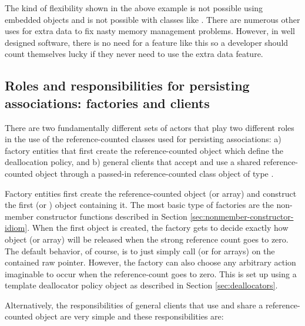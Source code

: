 \documentclass[pdf,ps2pdf,11pt]{SANDreport}
\begin{document}
The kind of flexibility shown in the above example is not possible
using embedded objects and is not possible with classes like
{}.  There are numerous other uses for extra
data to fix nasty memory management problems.  However, in well
designed software, there is no need for a feature like this so a
developer should count themselves lucky if they never need to use the
extra data feature.


%
{}\subsection{Roles and responsibilities for persisting associations:
factories and clients}
%

There are two fundamentally different sets of actors that play two
different roles in the use of the reference-counted classes used for
persisting associations: a) factory entities that first create the
reference-counted object {} which define the deallocation
policy, and b) general clients that accept and use a shared
reference-counted object {} through a passed-in
reference-counted class object of type {}.

Factory entities first create the reference-counted object (or array)
and construct the first {} (or {}) object
containing it.  The most basic type of factories are the non-member
constructor functions described in Section
{}\ref{sec:nonmember-constructor-idiom}.  When the first {}
object is created, the factory gets to decide exactly how object (or
array) will be released when the strong reference count goes to zero.
The default behavior, of course, is to just simply call {}
(or {} for arrays) on the contained raw pointer.
However, the factory can also choose any arbitrary action imaginable
to occur when the reference-count goes to zero.  This is set up using
a template deallocator policy object as described in Section
{}\ref{sec:deallocators}.

Alternatively, the responsibilities of general clients that use and
share a reference-counted object are very simple and these
responsibilities are:
\end{document}
